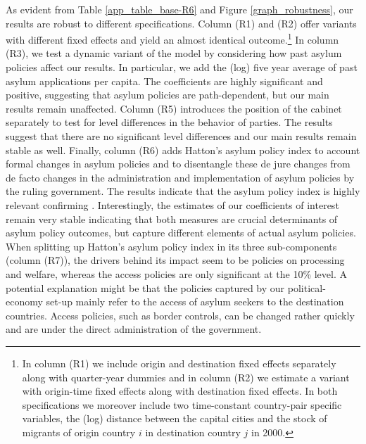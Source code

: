 \documentclass[a4paper,12pt]{article}
\begin{document}
As evident from Table \ref{app_table_base-R6} and Figure \ref{graph_robustness}, our results are robust to different specifications.
 Column (R1) and (R2)  offer variants with different fixed effects and yield an almost identical outcome.\footnote{In column (R1) we include origin and destination fixed effects separately along with quarter-year dummies and in column (R2) we estimate a variant with origin-time fixed effects along with destination fixed effects. In both specifications we moreover include two time-constant country-pair specific variables, the (log) distance between the capital cities and the stock of migrants of origin country $i$ in destination country $j$ in 2000.} In column (R3), we test a dynamic variant of the model by considering how past asylum policies affect our results. In particular, we add the (log) five year average of past asylum applications per capita. The coefficients are highly significant and positive, suggesting that asylum policies are path-dependent, but our main results remain unaffected. Column (R5) introduces the position of the cabinet separately to test for level differences in the behavior of parties. The results suggest that there are no significant level differences and our main results remain stable as well. Finally, column (R6) adds Hatton's asylum policy index to account formal changes in asylum policies and to disentangle these de jure changes from de facto changes in the administration and implementation of asylum policies by the ruling government. The results indicate that the asylum policy index is highly relevant confirming \citet{hatton2016}. Interestingly, the estimates of our coefficients of interest remain very stable indicating that both measures are crucial determinants of asylum policy outcomes, but capture different elements of actual asylum policies. When splitting up Hatton's asylum policy index in its three sub-components (column (R7)), the drivers behind its impact seem to be policies on processing and welfare, whereas the access policies are only significant at the 10\% level.
   A potential explanation might be that the policies captured by our political-economy set-up mainly refer to the access of asylum seekers to the destination countries. Access policies, such as border controls, can be changed rather quickly and are under the direct administration of the government. 
   
\end{document}
